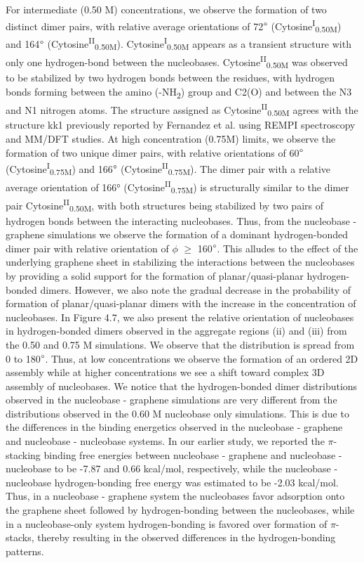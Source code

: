 For intermediate (0.50 M) concentrations, we observe the formation of two distinct dimer pairs, with relative average orientations of 72$\degree$ (Cytosine\textsuperscript{I}\textsubscript{0.50M}) and 164$\degree$ (Cytosine\textsuperscript{II}\textsubscript{0.50M}). Cytosine\textsuperscript{I}\textsubscript{0.50M} appears as a transient structure with only one hydrogen-bond between the nucleobases. Cytosine\textsuperscript{II}\textsubscript{0.50M} was observed to be stabilized by two hydrogen bonds between the residues, with hydrogen bonds forming between the amino (-NH\textsubscript{2}) group and C2(O) and between the N3 and N1 nitrogen atoms. The structure assigned as Cytosine\textsuperscript{II}\textsubscript{0.50M} agrees with the structure kk1 previously reported by Fernandez et al. using REMPI spectroscopy and MM/DFT studies.\supercite{gonzalez_competition_2017} At high concentration (0.75M) limits, we observe the formation of two unique dimer pairs, with relative orientations of 60$\degree$ (Cytosine\textsuperscript{I}\textsubscript{0.75M}) and 166$\degree$ (Cytosine\textsuperscript{II}\textsubscript{0.75M}). The dimer pair with a relative average orientation of 166° (Cytosine\textsuperscript{II}\textsubscript{0.75M}) is structurally similar to the dimer pair Cytosine\textsuperscript{II}\textsubscript{0.50M}, with both structures being stabilized by two pairs of hydrogen bonds between the interacting nucleobases. Thus, from the nucleobase - graphene simulations we observe the formation of a dominant hydrogen-bonded dimer pair with relative orientation of $\phi$ $\geq$ 160$\degree$. This alludes to the effect of the underlying graphene sheet in stabilizing the interactions between the nucleobases by providing a solid support for the formation of planar/quasi-planar hydrogen-bonded dimers. However, we also note the gradual decrease in the probability of formation of planar/quasi-planar dimers with the increase in the concentration of nucleobases. In Figure 4.7, we also present the relative orientation of nucleobases in hydrogen-bonded dimers observed in the aggregate regions (ii) and (iii) from the 0.50 and 0.75 M simulations. We observe that the distribution is spread from 0 to 180$\degree$. Thus, at low concentrations we observe the formation of an ordered 2D assembly while at higher concentrations we see a shift toward complex 3D assembly of nucleobases. We notice that the hydrogen-bonded dimer distributions observed in the nucleobase - graphene simulations are very different from the distributions observed in the 0.60 M nucleobase only simulations. This is due to the differences in the binding energetics observed in the nucleobase - graphene and nucleobase - nucleobase systems. In our earlier study, we reported the $\pi$-stacking binding free energies between nucleobase - graphene and nucleobase - nucleobase to be -7.87 and 0.66 kcal/mol, respectively, while the nucleobase - nucleobase hydrogen-bonding free energy was estimated to be -2.03 kcal/mol. Thus, in a nucleobase - graphene system the nucleobases favor adsorption onto the graphene sheet followed by hydrogen-bonding between the nucleobases, while in a nucleobase-only system hydrogen-bonding is favored over formation of $\pi$-stacks, thereby resulting in the observed differences in the hydrogen-bonding patterns.
